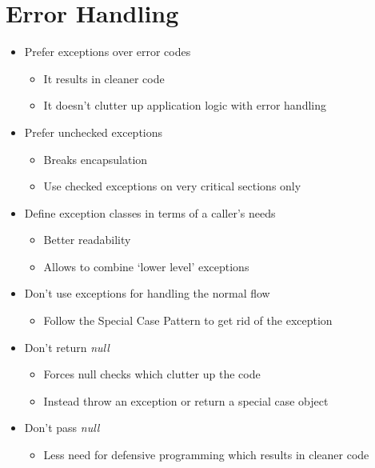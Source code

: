 \section{Error Handling}
\begin{itemize}
    \item Prefer exceptions over error codes
    \begin{itemize}
        \item It results in cleaner code
        \item It doesn't clutter up application logic with error handling
    \end{itemize}
    \item Prefer unchecked exceptions
    \begin{itemize}
        \item Breaks encapsulation
        \item Use checked exceptions on very critical sections only
    \end{itemize}
    \item Define exception classes in terms of a caller's needs
    \begin{itemize}
        \item Better readability
        \item Allows to combine `lower level' exceptions
    \end{itemize}
    \item Don't use exceptions for handling the normal flow
    \begin{itemize}
        \item Follow the Special Case Pattern to get rid of the exception
    \end{itemize}
    \item Don't return \textit{null}
    \begin{itemize}
        \item Forces null checks which clutter up the code
        \item Instead throw an exception or return a special case object
    \end{itemize}
    \item Don't pass \textit{null}
    \begin{itemize}
        \item Less need for defensive programming which results in cleaner code
    \end{itemize}
\end{itemize}
